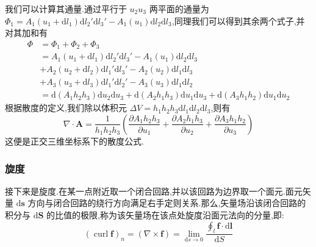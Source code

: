 \documentclass[UTF8]{ctexbook}
\newcommand{\D}{\text{d}}
\newcommand{\curl}{\operatorname{curl}}
\newcommand{\pd}[2]{\frac{\partial #1}{\partial #2}}
\begin{document}
我们可以计算其通量.通过平行于 $u_2u_3$ 两平面的通量为 $\Phi_1=A_1(u_1 + \D l_1) \D l_2'\D l_3'-A_1(u_1) \D l_2\D l_3$,同理我们可以得到其余两个式子,并对其加和有
\begin{align*}
    \Phi &= \Phi_1+\Phi_2+\Phi_3 \\
    &= A_1(u_1 + \D l_1) \D l_2'\D l_3'-A_1(u_1) \D l_2\D l_3 \\
    &+ A_2(u_2 + \D l_2) \D l_1'\D l_3'-A_2(u_2) \D l_1\D l_3 \\
    &+ A_3(u_3 + \D l_3) \D l_1'\D l_2'-A_3(u_3) \D l_1\D l_2 \\
    &= \D (A_1h_2h_3) \D u_2 \D u_3 + \D (A_2h_1h_3) \D u_1 \D u_3 + \D (A_3h_1h_2) \D u_1 \D u_2
\end{align*}
根据散度的定义,我们除以体积元 $\Delta V = h_1h_2h_3\D l_1 \D l_2 \D l_3$,则有
\begin{equation}
    \nabla \cdot \boldsymbol{A} = \frac{1}{h_1h_2h_3} \left(\pd{A_1h_2h_3}{u_1} + \pd{A_2h_1h_3}{u_2} + \pd{A_3h_1h_2}{u_3}\right)
\end{equation}
这便是正交三维坐标系下的散度公式.

\subsubsection{旋度}

\begin{definition}
    接下来是旋度.在某一点附近取一个闭合回路,并以该回路为边界取一个面元.面元矢量 $\D \boldsymbol{s}$ 方向与闭合回路的绕行方向满足右手定则关系.那么,矢量场沿该闭合回路的积分与 $\D \boldsymbol{S}$ 的比值的极限,称为该矢量场在该点处旋度沿面元法向的分量,即:
    \[\left(\curl \boldsymbol{f}\right)_n = \left(\nabla \times \boldsymbol{f}\right) = \lim_{\D s\to 0} \frac{\displaystyle \oint_l \boldsymbol{f} \cdot \D \boldsymbol{l}}{\D S}\]
\end{definition}
\end{document}
